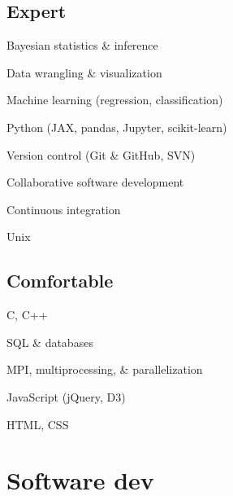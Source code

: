 \documentclass[letterpaper,12pt]{deedy-resume}
\begin{document}
\begin{minipage}[t]{0.32\textwidth}
\subsection{Expert}
\begin{tighteritemize}
    \item Bayesian statistics \& inference
    \item Data wrangling \& visualization
    \item Machine learning (regression, classification)
    \item Python {\footnotesize (JAX, pandas, Jupyter, scikit-learn)}
    \item Version control (Git \& GitHub, SVN)
    \item Collaborative software development
    \item Continuous integration
    \item Unix
\end{tighteritemize}

\sectionspace %

\subsection{Comfortable}
\begin{tighteritemize}
    \item C, C++
    \item SQL \& databases
    \item MPI, multiprocessing, \& parallelization
    \item JavaScript {\footnotesize (jQuery, D3)}
    \item HTML, CSS
\end{tighteritemize}

\sectionspace %



\section{Software dev}


\end{minipage}
\end{document}
